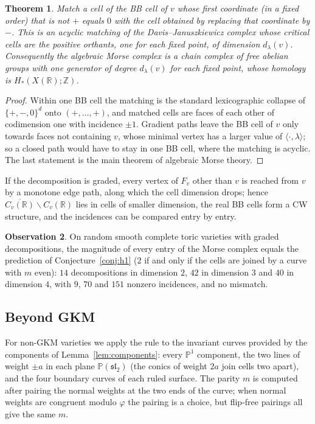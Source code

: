 \documentclass[11pt]{amsart}
\newtheorem{theorem}{Theorem}[section]
\theoremstyle{definition}
\newtheorem{observation}[theorem]{Observation}
\theoremstyle{remark}
\newcommand{\PP}{\mathbb{P}}
\newcommand{\ZZ}{\mathbb{Z}}
\newcommand{\RR}{\mathbb{R}}
\begin{document}
\begin{theorem}\label{thm:morse}
Match a cell of the BB cell of $v$ whose first coordinate (in a fixed order)
that is not $+$ equals $0$ with the cell obtained by replacing that
coordinate by $-$. This is an acyclic matching of the Davis--Januszkiewicz
complex whose critical cells are the positive orthants, one for each fixed
point, of dimension $d_\lambda(v)$. Consequently the algebraic Morse complex
\cite{Forman,Skoldberg,Kozlov} is a chain complex of free abelian groups with
one generator of degree $d_\lambda(v)$ for each fixed point, whose homology is
$H_*(X(\RR);\ZZ)$.
\end{theorem}
\begin{proof}
Within one BB cell the matching is the standard lexicographic collapse of
$\{+,-,0\}^d$ onto $(+,\dots,+)$, and matched cells are faces of each other
of codimension one with incidence $\pm1$. Gradient paths leave the BB cell
of $v$ only towards faces not containing $v$, whose minimal vertex has a
larger value of $\langle\cdot,\lambda\rangle$; so a closed path would have to
stay in one BB cell, where the matching is acyclic. The last statement is
the main theorem of algebraic Morse theory.
\end{proof}

If the decomposition is graded, every vertex of $F_v$ other than $v$ is
reached from $v$ by a monotone edge path, along which the cell dimension
drops; hence $\overline{C_v(\RR)}\smallsetminus C_v(\RR)$ lies in cells of
smaller dimension, the real BB cells form a CW structure, and the
incidences can be compared entry by entry.

\begin{observation}\label{obs:entrywise}
On random smooth complete toric varieties with graded decompositions, the
magnitude of every entry of the Morse complex equals the prediction of
Conjecture~\ref{conj:h1} ($2$ if and only if the cells are joined by a curve
with $m$ even): $14$ decompositions in dimension $2$, $42$ in dimension $3$
and $40$ in dimension $4$, with $9$, $70$ and $151$ nonzero incidences, and no
mismatch.
\end{observation}

\subsection{Beyond GKM}
For non-GKM varieties we apply the rule to the invariant curves provided by
the components of Lemma~\ref{lem:components}: every $\PP^1$ component, the
two lines of weight $\pm a$ in each plane $\PP(\mathfrak{sl}_2)$ (the conics of
weight $2a$ join cells two apart), and the four boundary curves of each
ruled surface. The parity $m$ is computed after pairing the normal weights at
the two ends of the curve; when normal weights are congruent modulo
$\varphi$ the pairing is a choice, but flip-free pairings all give the same
$m$.
\end{document}
